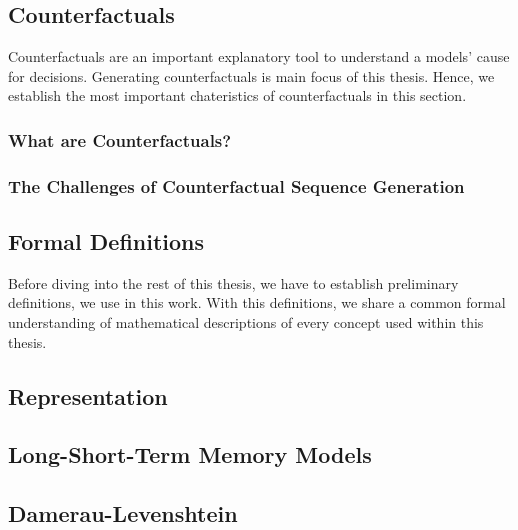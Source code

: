 \documentclass[runningheads]{llncs}
\begin{document}
\subsection{Counterfactuals}
\label{sec:counterfactuals}
Counterfactuals are an important explanatory tool to understand a models' cause for decisions. Generating counterfactuals is main focus of this thesis. Hence, we establish the most important chateristics of counterfactuals in this section.

\subsubsection{What are Counterfactuals?}


% 

\subsubsection{The Challenges of Counterfactual Sequence Generation}



\subsection{Formal Definitions}
\label{sec:formulas}
Before diving into the rest of this thesis, we have to establish preliminary definitions, we use in this work. With this definitions, we share a common formal understanding of mathematical descriptions of every concept used within this thesis. 


\subsection{Representation}
\label{sec:representation}


\subsection{Long-Short-Term Memory Models}
\label{sec:lstm}


\subsection{Damerau-Levenshtein}
\label{sec:damerau}

\end{document}
